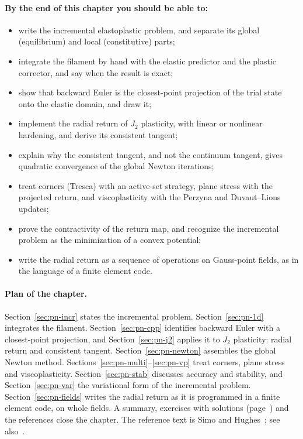 \paragraph{By the end of this chapter you should be able to:}
\begin{itemize}
  \item write the incremental elastoplastic problem, and separate its global
  (equilibrium) and local (constitutive) parts;
  \item integrate the filament by hand with the elastic predictor and the
  plastic corrector, and say when the result is exact;
  \item show that backward Euler is the closest-point projection of the trial
  state onto the elastic domain, and draw it;
  \item implement the radial return of $J_2$ plasticity, with linear or
  nonlinear hardening, and derive its consistent tangent;
  \item explain why the consistent tangent, and not the continuum tangent,
  gives quadratic convergence of the global Newton iterations;
  \item treat corners (Tresca) with an active-set strategy, plane stress with
  the projected return, and viscoplasticity with the Perzyna and Duvaut--Lions
  updates;
  \item prove the contractivity of the return map, and recognize the
  incremental problem as the minimization of a convex potential;
  \item write the radial return as a sequence of operations on Gauss-point
  fields, as in the language of a finite element code.
\end{itemize}

\paragraph{Plan of the chapter.} Section~\ref{sec:pn-incr} states the
incremental problem. Section~\ref{sec:pn-1d} integrates the filament.
Section~\ref{sec:pn-cpp} identifies backward Euler with a closest-point
projection, and Section~\ref{sec:pn-j2} applies it to $J_2$ plasticity: radial
return and consistent tangent. Section~\ref{sec:pn-newton} assembles the global
Newton method. Sections~\ref{sec:pn-multi}--\ref{sec:pn-vp} treat corners, plane
stress and viscoplasticity. Section~\ref{sec:pn-stab} discusses accuracy and
stability, and Section~\ref{sec:pn-var} the variational form of the
incremental problem. Section~\ref{sec:pn-fields} writes the radial return as
it is programmed in a finite element code, on whole fields. A summary, exercises with solutions
(page~\pageref{sec:pn-exo}) and the references close the chapter. The reference
text is Simo and Hughes~\cite[Ch.~1--3,~6]{SimoHughesCI}; see
also~\cite{deSouzaNeto2008,Maitournam2012b,KondoMaitournam2023b}.

